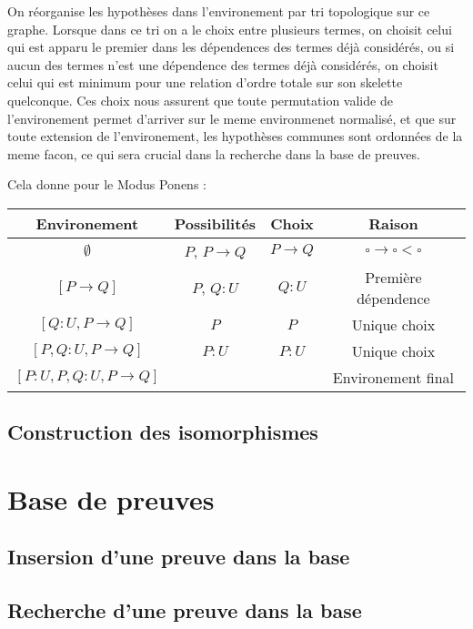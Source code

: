 \documentclass[12pt, a4paper]{article}
\begin{document}
On réorganise les hypothèses dans l'environement par tri topologique sur ce graphe. Lorsque dans ce tri on a le choix entre plusieurs termes, on choisit celui qui est apparu le premier dans les dépendences des termes déjà considérés, ou si aucun des termes n'est une dépendence des termes déjà considérés, on choisit celui qui est minimum pour une relation d'ordre totale sur son skelette quelconque. Ces choix nous assurent que toute permutation valide de l'environement permet d'arriver sur le meme environmenet normalisé, et que sur toute extension de l'environement, les hypothèses communes sont ordonnées de la meme facon, ce qui sera crucial dans la recherche dans la base de preuves.

Cela donne pour le Modus Ponens : \\
\begin{tabular}{ | c | c | c | c | }
\hline
Environement & Possibilités & Choix & Raison \\
\hline
$\emptyset$ & $P$, $P \rightarrow Q$ & $P \rightarrow Q$ & $ \square \rightarrow \square < \square $ \\
$[P \rightarrow Q]$ & $P$, $Q : U$ & $Q : U$ & Première dépendence \\
$[Q : U, P \rightarrow Q]$ & $P$ & $P$ & Unique choix \\
$[P, Q : U, P \rightarrow Q]$ & $P : U$ & $P : U$ & Unique choix \\
$[P : U, P, Q : U, P \rightarrow Q]$ & & & Environement final \\
\hline
\end{tabular}

\subsection{Construction des isomorphismes}

\section{Base de preuves}
\subsection{Insersion d'une preuve dans la base}
\subsection{Recherche d'une preuve dans la base}

\nocite{*}



% 
\end{document}
